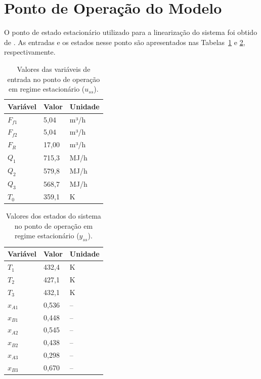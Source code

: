 \clearpage

\section{Ponto de Operação do Modelo}
\label{sec:apendice_ponto_operacao}

O ponto de estado estacionário utilizado para a linearização do sistema foi obtido de \textcite{pourkargar_2017}. As entradas e os estados nesse ponto são apresentados nas Tabelas~\ref{tab:us_ponto_operacao} e \ref{tab:ys_ponto_operacao}, respectivamente.

\begin{table}[h]
  \caption{Valores das variáveis de entrada no ponto de operação em regime estacionário ($u_{ss}$).}
  \label{tab:us_ponto_operacao}
  \centering
  \begin{tabular}{lll}
    \hline
    Variável & Valor & Unidade \\
    \hline
    $F_{f1}$ & 5{,}04   & m³/h \\
    $F_{f2}$ & 5{,}04   & m³/h \\
    $F_R$    & 17{,}00  & m³/h \\
    $Q_1$    & 715{,}3  & MJ/h \\
    $Q_2$    & 579{,}8  & MJ/h \\
    $Q_3$    & 568{,}7  & MJ/h \\
    $T_0$    & 359{,}1  & K    \\
    \hline
  \end{tabular}
\end{table}

\begin{table}[h]
  \caption{Valores dos estados do sistema no ponto de operação em regime estacionário ($y_{ss}$).}
  \label{tab:ys_ponto_operacao}
  \centering
  \begin{tabular}{lll}
    \hline
    Variável  & Valor & Unidade \\
    \hline
    $T_1$     & 432{,}4 & K  \\
    $T_2$     & 427{,}1 & K  \\
    $T_3$     & 432{,}1 & K  \\
    $x_{A1}$  & 0{,}536 & -- \\
    $x_{B1}$  & 0{,}448 & -- \\
    $x_{A2}$  & 0{,}545 & -- \\
    $x_{B2}$  & 0{,}438 & -- \\
    $x_{A3}$  & 0{,}298 & -- \\
    $x_{B3}$  & 0{,}670 & -- \\
    \hline
  \end{tabular}
\end{table}

